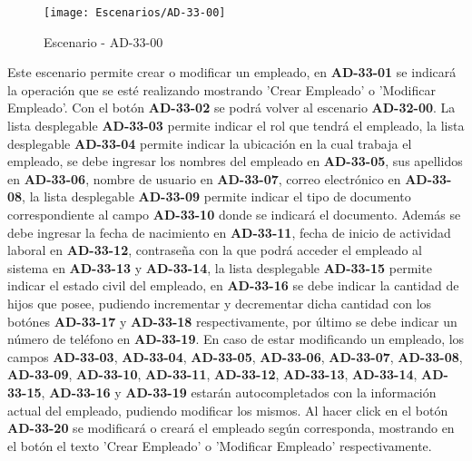 \begin{figure}[H]
\centering
\texttt{[image: Escenarios/AD-33-00]}
\caption{Escenario - AD-33-00}
\label{fig:AD-33-00}
\end{figure}

Este escenario permite crear o modificar un empleado, en \textbf{AD-33-01} se indicará la operación que se esté realizando mostrando 'Crear Empleado' o 'Modificar Empleado'. Con el botón \textbf{AD-33-02} se podrá volver al escenario \textbf{AD-32-00}.
La lista desplegable \textbf{AD-33-03} permite indicar el rol que tendrá el empleado, la lista desplegable \textbf{AD-33-04} permite indicar la ubicación en la cual trabaja el empleado, se debe ingresar los nombres del empleado en \textbf{AD-33-05}, sus apellidos en \textbf{AD-33-06}, nombre de usuario en \textbf{AD-33-07}, correo electrónico en \textbf{AD-33-08}, la lista desplegable \textbf{AD-33-09} permite indicar el tipo de documento correspondiente al campo \textbf{AD-33-10} donde se indicará el documento. Además se debe ingresar la fecha de nacimiento en \textbf{AD-33-11}, fecha de inicio de actividad laboral en \textbf{AD-33-12}, contraseña con la que podrá acceder el empleado al sistema en \textbf{AD-33-13} y \textbf{AD-33-14}, la lista desplegable \textbf{AD-33-15} permite indicar el estado civil del empleado, en \textbf{AD-33-16} se debe indicar la cantidad de hijos que posee, pudiendo incrementar y decrementar dicha cantidad con los botónes \textbf{AD-33-17} y \textbf{AD-33-18} respectivamente, por último se debe indicar un número de teléfono en \textbf{AD-33-19}. 
En caso de estar modificando un empleado, los campos \textbf{AD-33-03}, \textbf{AD-33-04}, \textbf{AD-33-05}, \textbf{AD-33-06}, \textbf{AD-33-07}, \textbf{AD-33-08}, \textbf{AD-33-09}, \textbf{AD-33-10}, \textbf{AD-33-11}, \textbf{AD-33-12}, \textbf{AD-33-13}, \textbf{AD-33-14}, \textbf{AD-33-15}, \textbf{AD-33-16} y \textbf{AD-33-19} estarán autocompletados con la información actual del empleado, pudiendo modificar los mismos. 
Al hacer click en el botón \textbf{AD-33-20} se modificará o creará el empleado según corresponda, mostrando en el botón el texto 'Crear Empleado' o 'Modificar Empleado' respectivamente.
\clearpage
